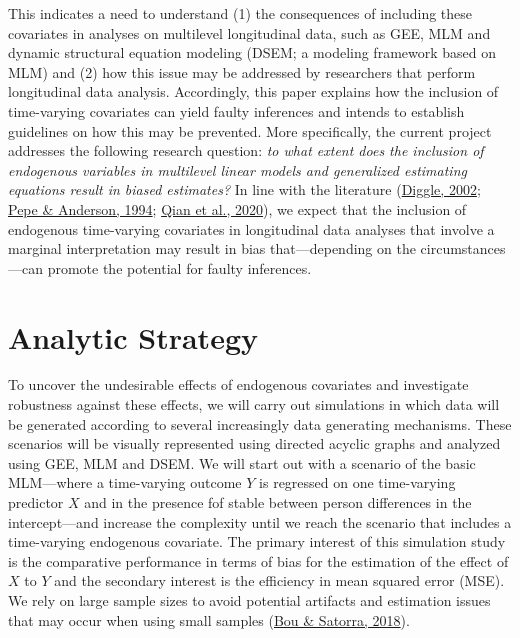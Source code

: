 \documentclass[
  12pt,
  a4paper,
]{article}
\begin{document}
This indicates a need to understand (1) the consequences of including
these covariates in analyses on multilevel longitudinal data, such as
GEE, MLM and dynamic structural equation modeling (DSEM; a modeling
framework based on MLM) and (2) how this issue may be addressed by
researchers that perform longitudinal data analysis. Accordingly, this
paper explains how the inclusion of time-varying covariates can yield
faulty inferences and intends to establish guidelines on how this may be
prevented. More specifically, the current project addresses the
following research question: \emph{to what extent does the inclusion of
endogenous variables in multilevel linear models and generalized
estimating equations result in biased estimates?} In line with the
literature (\protect\hyperlink{ref-diggle2002}{Diggle, 2002};
\protect\hyperlink{ref-pepe1994}{Pepe \& Anderson, 1994};
\protect\hyperlink{ref-qian2020}{Qian et al., 2020}), we expect that the
inclusion of endogenous time-varying covariates in longitudinal data
analyses that involve a marginal interpretation may result in bias
that---depending on the circumstances---can promote the potential for
faulty inferences.

\hypertarget{analytic-strategy}{%
\section{Analytic Strategy}\label{analytic-strategy}}

To uncover the undesirable effects of endogenous covariates and
investigate robustness against these effects, we will carry out
simulations in which data will be generated according to several
increasingly data generating mechanisms. These scenarios will be
visually represented using directed acyclic graphs and analyzed using
GEE, MLM and DSEM. We will start out with a scenario of the basic
MLM---where a time-varying outcome \(Y\) is regressed on one
time-varying predictor \(X\) and in the presence fof stable between
person differences in the intercept---and increase the complexity until
we reach the scenario that includes a time-varying endogenous covariate.
The primary interest of this simulation study is the comparative
performance in terms of bias for the estimation of the effect of \(X\)
to \(Y\) and the secondary interest is the efficiency in mean squared
error (MSE). We rely on large sample sizes to avoid potential artifacts
and estimation issues that may occur when using small samples
(\protect\hyperlink{ref-bou2018}{Bou \& Satorra, 2018}).
\end{document}
